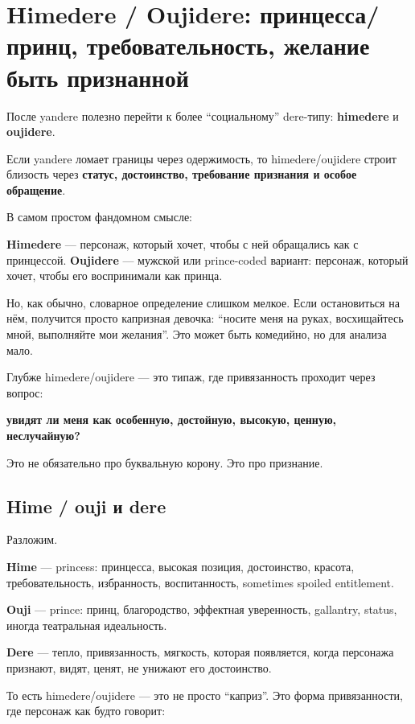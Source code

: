 \section{Himedere / Oujidere: принцесса/принц, требовательность, желание быть признанной}

После yandere полезно перейти к более ``социальному'' dere-типу:
\textbf{himedere} и \textbf{oujidere}.

Если yandere ломает границы через одержимость, то himedere/\hspace{0pt}oujidere
строит близость через \textbf{статус, достоинство, требование признания
и особое обращение}.

В самом простом фандомном смысле:

\textbf{Himedere} --- персонаж, который хочет, чтобы с ней обращались
как с принцессой. \textbf{Oujidere} --- мужской или prince-coded
вариант: персонаж, который хочет, чтобы его воспринимали как принца.

Но, как обычно, словарное определение слишком мелкое. Если остановиться
на нём, получится просто капризная девочка: ``носите меня на руках,
восхищайтесь мной, выполняйте мои желания''. Это может быть комедийно,
но для анализа мало.

Глубже himedere/\hspace{0pt}oujidere --- это типаж, где привязанность проходит через
вопрос:

\textbf{увидят ли меня как особенную, достойную, высокую, ценную,
неслучайную?}

Это не обязательно про буквальную корону. Это про признание.

\subsection*{Hime /\hspace{0pt} ouji и dere}

Разложим.

\textbf{Hime} --- princess: принцесса, высокая позиция, достоинство,
красота, требовательность, избранность, воспитанность, sometimes spoiled
entitlement.

\textbf{Ouji} --- prince: принц, благородство, эффектная уверенность,
gallantry, status, иногда театральная идеальность.

\textbf{Dere} --- тепло, привязанность, мягкость, которая появляется,
когда персонажа признают, видят, ценят, не унижают его достоинство.

То есть himedere/\hspace{0pt}oujidere --- это не просто ``каприз''. Это форма
привязанности, где персонаж как будто говорит:

